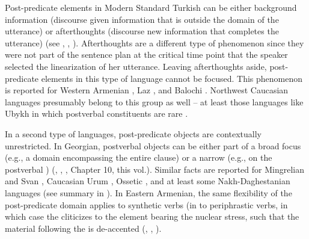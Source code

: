 \documentclass[output=paper,colorlinks,citecolor=brown]{langscibook}
\begin{document}
Post-predicate elements in Modern Standard Turkish can be either background information (discourse given information that is outside the  domain of the utterance) or afterthoughts (discourse new information that completes the utterance) (see \citealt[50--56]{taylan_function_1984}, \citealt[]{issever_information_2003}, \citealt[727-728]{kilicaslan_syntax_2004}). Afterthoughts are a different type of phenomenon since they were not part of the sentence plan at the critical time point that the speaker selected the linearization of her utterance. Leaving afterthoughts aside, post-predicate elements in this type of language cannot be focused. This phenomenon is reported for Western Armenian \citep[§2.7]{donabedian-demopoulos_middle_2018}, Laz \citep[852]{lacroix_laz_2018}, and Balochi \citep[66-68]{delforooz_discourse_2010}. Northwest Caucasian languages presumably belong to this group as well -- at least those languages like Ubykh in which postverbal constituents are rare \citep[977]{forker_information_2021}.

In a second type of languages, post-predicate objects are contextually unrestricted. In Georgian, postverbal objects can be either part of a broad focus (e.g., a  domain encompassing the entire clause) or a narrow  (e.g.,  on the postverbal ) (\citealt[]{skopeteas_Fanselow_focus_2010}, \citealt[170]{gosby_information_2016}, \citealt[106, 235]{borise_phrasing_2019}, Chapter 10, this vol.). Similar facts are reported for Mingrelian and Svan \citep[994]{forker_information_2021}, Caucasian Urum \citep[221]{schroter_information_2017}, Ossetic \citep[686]{erschler_preverbal_2012}, and at least some Nakh-Daghestanian languages (see summary in \citealt[977]{forker_information_2021}). In Eastern Armenian, the same flexibility of the post-predicate domain applies to synthetic verbs (in  to periphrastic verbs, in which case the  cliticizes to the element bearing the nuclear stress, such that the material following the  is de-accented (\citealt[]{comrie_formal_1984}, \citealt[]{kahnemuyipour_second_2011}, \citealt[]{samvelian_persistence_2023}).  
\end{document}
